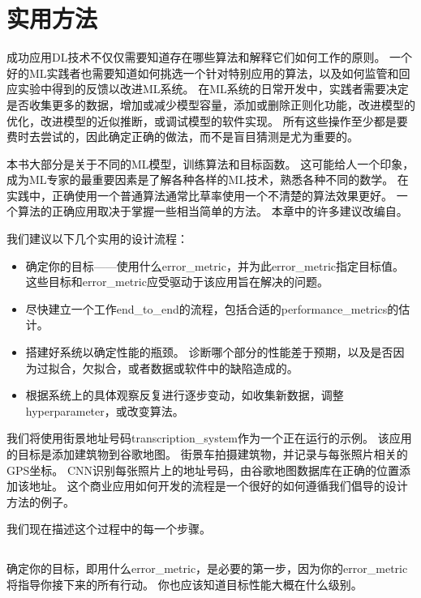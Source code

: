 \chapter{实用方法}
\label{chap:practical_methodology}
成功应用\gls{DL}技术不仅仅需要知道存在哪些算法和解释它们如何工作的原则。
一个好的\gls{ML}实践者也需要知道如何挑选一个针对特别应用的算法，以及如何监管和回应实验中得到的反馈以改进\gls{ML}系统。
在\gls{ML}系统的日常开发中，实践者需要决定是否收集更多的数据，增加或减少模型容量，添加或删除正则化功能，改进模型的优化，改进模型的近似推断，或调试模型的软件实现。
所有这些操作至少都是要费时去尝试的，因此确定正确的做法，而不是盲目猜测是尤为重要的。

本书大部分是关于不同的\gls{ML}模型，训练算法和目标函数。
这可能给人一个印象，成为\gls{ML}专家的最重要因素是了解各种各样的\gls{ML}技术，熟悉各种不同的数学。
在实践中，正确使用一个普通算法通常比草率使用一个不清楚的算法效果更好。
一个算法的正确应用取决于掌握一些相当简单的方法。
本章中的许多建议改编自\cite{ng-lecture-advice}。

我们建议以下几个实用的设计流程：
\begin{itemize}
\item 确定你的目标——使用什么\gls{error_metric}，并为此\gls{error_metric}指定目标值。
这些目标和\gls{error_metric}应受驱动于该应用旨在解决的问题。


\item 尽快建立一个工作\gls{end_to_end}的流程，包括合适的\gls{performance_metrics}的估计。

\item 搭建好系统以确定性能的瓶颈。
诊断哪个部分的性能差于预期，以及是否因为过拟合，欠拟合，或者数据或软件中的缺陷造成的。

\item 根据系统上的具体观察反复进行逐步变动，如收集新数据，调整\gls{hyperparameter}，或改变算法。
\end{itemize}

我们将使用街景地址号码\gls{transcription_system}\citep{Goodfellow+et+al-ICLR2014a}作为一个正在运行的示例。
该应用的目标是添加建筑物到谷歌地图。
街景车拍摄建筑物，并记录与每张照片相关的GPS坐标。
\gls{CNN}识别每张照片上的地址号码，由谷歌地图数据库在正确的位置添加该地址。
这个商业应用如何开发的流程是一个很好的如何遵循我们倡导的设计方法的例子。

我们现在描述这个过程中的每一个步骤。

\section{}
\label{sec:performance_metrics}
确定你的目标，即用什么\gls{error_metric}，是必要的第一步，因为你的\gls{error_metric}将指导你接下来的所有行动。
你也应该知道目标性能大概在什么级别。

